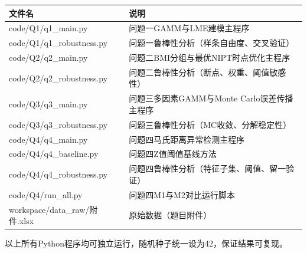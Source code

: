 \documentclass[withoutpreface]{cumcmthesis}
\begin{document}
\begin{table}[H]
\centering
\begin{tabular}{lp{28em}}
\toprule
文件名 & 说明 \\
\midrule
code/Q1/q1\_main.py & 问题一GAMM与LME建模主程序 \\
code/Q1/q1\_robustness.py & 问题一鲁棒性分析（样条自由度、交叉验证） \\
code/Q2/q2\_main.py & 问题二BMI分组与最优NIPT时点优化主程序 \\
code/Q2/q2\_robustness.py & 问题二鲁棒性分析（断点、权重、阈值敏感性） \\
code/Q3/q3\_main.py & 问题三多因素GAMM与Monte Carlo误差传播主程序 \\
code/Q3/q3\_robustness.py & 问题三鲁棒性分析（MC收敛、分解稳定性） \\
code/Q4/q4\_main.py & 问题四马氏距离异常检测主程序 \\
code/Q4/q4\_baseline.py & 问题四Z值阈值基线方法 \\
code/Q4/q4\_robustness.py & 问题四鲁棒性分析（特征子集、阈值、留一验证） \\
code/Q4/run\_all.py & 问题四M1与M2对比运行脚本 \\
workspace/data\_raw/附件.xlsx & 原始数据（题目附件） \\
\bottomrule
\end{tabular}
\end{table}

以上所有Python程序均可独立运行，随机种子统一设为42，保证结果可复现。
\end{document}
